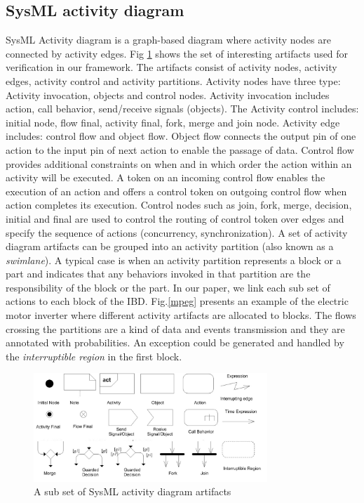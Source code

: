 \documentclass[3p,times,procedia,authoryear,round]{elsarticle}
\begin{document}
\subsection{SysML activity diagram}

SysML Activity diagram \citep{OMG} is a graph-based diagram where activity nodes are connected by activity edges. Fig \ref{fig2} shows the set of interesting artifacts used for verification in our framework. The artifacts consist of activity nodes, activity edges, activity control and  activity partitions. Activity nodes have three type: Activity invocation, objects and control nodes. Activity invocation includes action, call behavior, send/receive signals (objects). The Activity control includes:  initial node, flow final, activity final, fork, merge and join node. Activity edge includes: control flow and object flow. Object flow connects the output pin of one action to the input pin of next action to enable the passage of data. Control flow provides additional constraints on when and in which order the action within an activity will be executed. A token on an incoming control flow enables the execution of an action and offers a control token on outgoing control flow when action completes its execution. Control nodes such as join, fork, merge, decision, initial and final are used to control the routing of control token over edges and specify the sequence of actions (concurrency, synchronization). A set of activity diagram artifacts can be grouped into an activity partition (also known as a \emph{swimlane}). A typical case is when an activity partition represents a block or a part and indicates that any behaviors invoked in that partition are the responsibility of the block or the part. In our paper, we link each sub set of actions to each block of the IBD. Fig.\ref{mpeg} presents an example of the electric motor inverter \citep{Cherfi201442} where different activity artifacts are allocated to blocks. The flows crossing the partitions are a kind of data and events transmission and they are annotated with probabilities. An exception could be generated and handled by the \emph{interruptible region} in the first block.
\begin{figure}[!ht]
	\centering
	\includegraphics[width=250pt]{artefacts.jpg}
	\caption{A sub set of SysML activity diagram artifacts}
	\label{fig2}
\end{figure}
\end{document}

